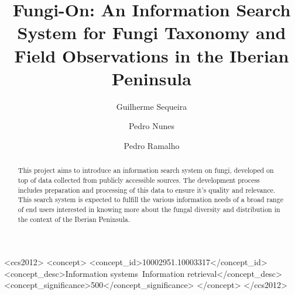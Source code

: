 \documentclass[sigconf]{acmart}
\begin{document}
\title{Fungi-On: An Information Search System for Fungi Taxonomy and Field Observations in the Iberian Peninsula}

\author{Guilherme Sequeira}

\author{Pedro Nunes}

\author{Pedro Ramalho}

\renewcommand{\shortauthors}{Guilherme Sequeira, Pedro Nunes, and Pedro Ramalho}

\begin{abstract}

  This project aims to introduce an information search system on fungi, developed on top of data collected from publicly accessible sources. The development process includes preparation and processing of this data to ensure it's quality and relevance. This search system is expected to fulfill the various information needs of a broad range of end users interested in knowing more about the fungal diversity and distribution in the context of the Iberian Peninsula. 
\end{abstract}

\begin{CCSXML}
<ccs2012>
<concept>
<concept_id>10002951.10003317</concept_id>
<concept_desc>Information systems~Information retrieval</concept_desc>
<concept_significance>500</concept_significance>
</concept>
</ccs2012>
\end{CCSXML}

\end{document}
